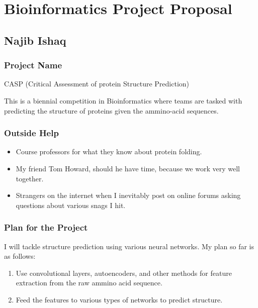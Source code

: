 \documentclass[]{article}
\date{}
\providecommand{\tightlist}{%
  \setlength{\itemsep}{0pt}\setlength{\parskip}{0pt}}
\begin{document}
\section{Bioinformatics Project
Proposal}\label{bioinformatics-project-proposal}

\subsection{Najib Ishaq}\label{najib-ishaq}

\subsubsection{Project Name}\label{project-name}

CASP (Critical Assessment of protein Structure Prediction)

This is a biennial competition in Bioinformatics where teams are tasked
with predicting the structure of proteins given the ammino-acid
sequences.

\subsubsection{Outside Help}\label{outside-help}

\begin{itemize}
\tightlist
\item
  Course professors for what they know about protein folding.
\item
  My friend Tom Howard, should he have time, because we work very well
  together.
\item
  Strangers on the internet when I inevitably post on online forums
  asking questions about various snags I hit.
\end{itemize}

\subsubsection{Plan for the Project}\label{plan-for-the-project}

I will tackle structure prediction using various neural networks. My
plan so far is as follows:

\begin{enumerate}
\def\labelenumi{\arabic{enumi}.}
\tightlist
\item
  Use convolutional layers, autoencoders, and other methods for feature
  extraction from the raw ammino acid sequence.
\item
  Feed the features to various types of networks to predict structure.
\end{enumerate}
\end{document}
